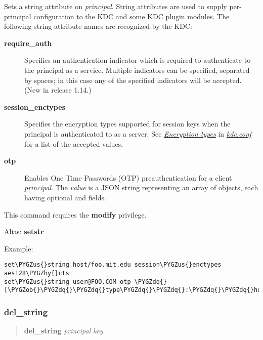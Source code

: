 \documentclass[letterpaper,10pt,english]{sphinxmanual}
\def\PYGZus{\char`\_}
\def\PYGZob{\char`\{}
\def\PYGZcb{\char`\}}
\def\PYGZhy{\char`\-}
\def\PYGZdq{\char`\"}
\begin{document}
Sets a string attribute on \emph{principal}.  String attributes are used to
supply per-principal configuration to the KDC and some KDC plugin
modules.  The following string attribute names are recognized by the
KDC:
\begin{description}
\item[{\textbf{require\_auth}}] \leavevmode
Specifies an authentication indicator which is required to
authenticate to the principal as a service.  Multiple indicators
can be specified, separated by spaces; in this case any of the
specified indicators will be accepted.  (New in release 1.14.)

\item[{\textbf{session\_enctypes}}] \leavevmode
Specifies the encryption types supported for session keys when the
principal is authenticated to as a server.  See
{\hyperref[admin/conf_files/kdc_conf:encryption-types]{\emph{Encryption types}}} in {\hyperref[admin/conf_files/kdc_conf:kdc-conf-5]{\emph{kdc.conf}}} for a list of the
accepted values.

\item[{\textbf{otp}}] \leavevmode
Enables One Time Passwords (OTP) preauthentication for a client
\emph{principal}.  The \emph{value} is a JSON string representing an array
of objects, each having optional  and  fields.

\end{description}

This command requires the \textbf{modify} privilege.

Alias: \textbf{setstr}

Example:

\begin{Verbatim}[commandchars=\\\{\}]
set\PYGZus{}string host/foo.mit.edu session\PYGZus{}enctypes aes128\PYGZhy{}cts
set\PYGZus{}string user@FOO.COM otp \PYGZdq{}[\PYGZob{}\PYGZdq{}\PYGZdq{}type\PYGZdq{}\PYGZdq{}:\PYGZdq{}\PYGZdq{}hotp\PYGZdq{}\PYGZdq{},\PYGZdq{}\PYGZdq{}username\PYGZdq{}\PYGZdq{}:\PYGZdq{}\PYGZdq{}al\PYGZdq{}\PYGZdq{}\PYGZcb{}]\PYGZdq{}
\end{Verbatim}
\label{admin/admin_commands/kadmin_local:set-string-end}

\subsubsection{del\_string}
\label{admin/admin_commands/kadmin_local:set-string-end}\label{admin/admin_commands/kadmin_local:del-string}\label{admin/admin_commands/kadmin_local:id11}\begin{quote}

\textbf{del\_string} \emph{principal} \emph{key}
\end{quote}
\end{document}
